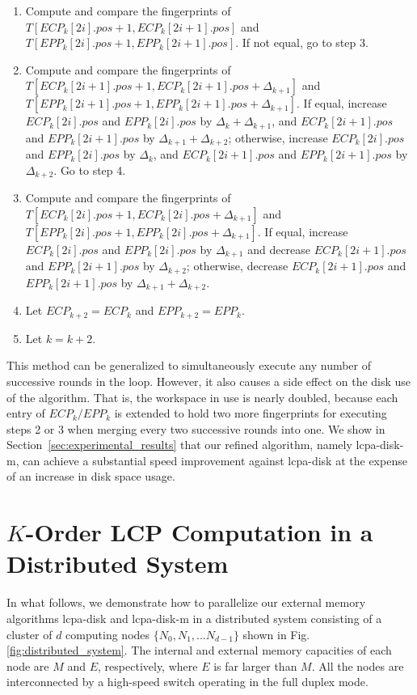 \documentclass{llncs}
\begin{document}
\begin{enumerate}
\item Compute and compare the fingerprints of $T[ECP_k[2i].pos+1,ECP_k[2i+1].pos]$ and $T[EPP_k[2i].pos+1,EPP_k[2i+1].pos]$. If not equal, go to step 3.
\item Compute and compare the fingerprints of $T[ECP_k[2i+1].pos+1,ECP_k[2i+1].pos+\Delta_{k+1}]$ and $T[EPP_k[2i+1].pos+1,EPP_k[2i+1].pos+\Delta_{k+1}]$. If equal, increase $ECP_k[2i].pos$ and $EPP_k[2i].pos$ by $\Delta_{k}+\Delta_{k+1}$, and $ECP_k[2i+1].pos$ and $EPP_k[2i+1].pos$ by $\Delta_{k+1}+\Delta_{k+2}$; otherwise, increase $ECP_k[2i].pos$ and $EPP_k[2i].pos$ by $\Delta_{k}$, and $ECP_k[2i+1].pos$ and $EPP_k[2i+1].pos$ by $\Delta_{k+2}$. Go to step 4.
\item Compute and compare the fingerprints of $T[ECP_k[2i].pos+1,ECP_k[2i].pos+\Delta_{k+1}]$ and $T[EPP_k[2i].pos+1,EPP_k[2i].pos+\Delta_{k+1}]$. If equal, increase $ECP_k[2i].pos$ and $EPP_k[2i].pos$ by $\Delta_{k+1}$ and decrease $ECP_k[2i+1].pos$ and $EPP_k[2i+1].pos$ by $\Delta_{k+2}$; otherwise, decrease $ECP_k[2i+1].pos$ and $EPP_k[2i+1].pos$ by $\Delta_{k+1}+\Delta_{k+2}$.
\item Let $ECP_{k+2}=ECP_{k}$ and $EPP_{k+2}=EPP_{k}$.
\item Let $k = k+2$.
\end{enumerate}

This method can be generalized to simultaneously execute any number of successive rounds in the loop. However, it also causes a side effect on the disk use of the algorithm. That is, the workspace in use is nearly doubled, because each entry of $ECP_k/EPP_k$ is extended to hold two more fingerprints for executing steps 2 or 3 when merging every two successive rounds into one. We show in Section~\ref{sec:experimental_results} that our refined algorithm, namely lcpa-disk-m, can achieve a substantial speed improvement against lcpa-disk at the expense of an increase in disk space usage.

\section{$K$-Order LCP Computation in a Distributed System}\label{sec:construction_in_distributed}
In what follows, we demonstrate how to parallelize our external memory algorithms lcpa-disk and lcpa-disk-m in a distributed system consisting of a cluster of $d$ computing nodes $\{N_0, N_1, ...N_{d-1}\}$ shown in Fig.\ref{fig:distributed_system}. The internal and external memory capacities of each node are $M$ and $E$, respectively, where $E$ is far larger than $M$. All the nodes are interconnected by a high-speed switch operating in the full duplex mode.
\end{document}
